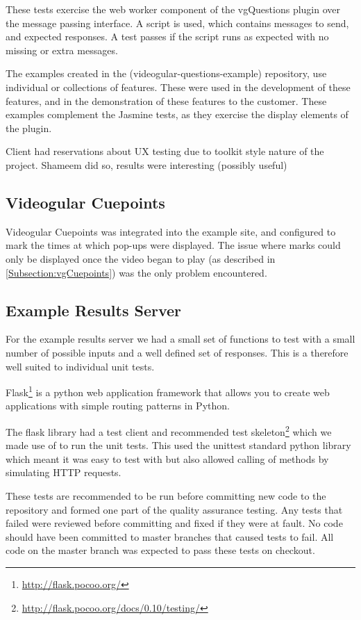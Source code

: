 These tests exercise the web worker component of the \gls{vgQuestions} plugin over the message passing interface. A script is used, which contains messages to send, and expected responses. A test passes if the script runs as expected with no missing or extra messages.

The examples created in the (videogular-questions-example) repository, use individual or collections of features. These were used in the development of these features, and in the demonstration of these features to the customer.  These examples complement the Jasmine tests, as they exercise the display elements of the plugin.

Client had reservations about UX testing due to toolkit style nature of the project. Shameem did so, results were interesting (possibly useful) 

\subsection{Videogular Cuepoints}
\label{Subsection:Videogular Cuepoints in example}
\gls{Videogular} Cuepoints was integrated into the example site, and configured to mark the times at which pop-ups were displayed. The issue where marks could only be displayed once the video began to play (as described in \autoref{Subsection:vgCuepoints}) was the only problem encountered.

\subsection{Example Results Server}
\label{Subsection:Example Results Server in example}
For the example results server we had a small set of functions to test with a small number of possible inputs and a well defined set of responses. This is a therefore well suited to individual unit tests.

Flask\footnote{\url{http://flask.pocoo.org/}} is a python web application framework that allows you to create web applications with simple routing patterns in Python.

The flask library had a test client and recommended test skeleton\footnote{\url{http://flask.pocoo.org/docs/0.10/testing/}} which we made use of to run the unit tests. This used the unittest standard python library which meant it was easy to test with but also allowed calling of methods by simulating HTTP requests.

These tests are recommended to be run before committing new code to the repository and formed one part of the quality assurance testing. Any tests that failed were reviewed before committing and fixed if they were at fault. No code should have been committed to master branches that caused tests to fail. All code on the master branch was expected to pass these tests on checkout.


